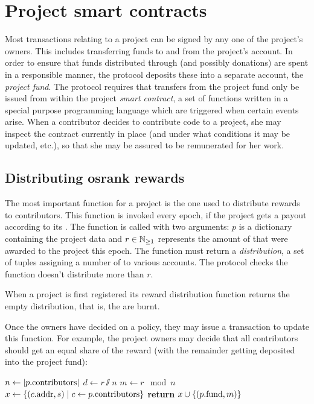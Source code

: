 
\section{Project smart contracts}
\label{s:smart-contracts}

Most transactions relating to a project can be signed by any one of the
project's owners. This includes transferring funds to and from the project's
account. In order to ensure that funds distributed through \osrank{} (and
possibly donations) are spent in a responsible manner, the protocol deposits
these into a separate account, the \emph{project fund}. The protocol requires
that transfers from the project fund only be issued from within the project
\emph{smart contract}, a set of functions written in a special purpose
programming language which are triggered when certain events arise. When a
contributor decides to contribute code to a project, she may inspect the
contract currently in place (and under what conditions it may be updated, etc.),
so that she may be assured to be remunerated for her work.

\subsection{Distributing osrank rewards}

The most important function for a project is the one used to distribute rewards
to contributors. This function is invoked every epoch, if the project gets a
payout according to its \osrank{}. The function is called with two arguments:
$p$ is a dictionary containing the project data and $r \in \mathbb{N}_{\geq 1}$ represents
the amount of \oscoin{} that were awarded to the project this epoch. The
function must return a \emph{distribution}, a set of tuples assigning a number
of \oscoin{} to various accounts. The protocol checks the function doesn't
distribute more than $r$.

When a project is first registered its reward distribution function returns the
empty distribution, that is, the \oscoin{} are burnt.

Once the owners have decided on a policy, they may issue a transaction to update
this function. For example, the project owners may decide that all contributors
should get an equal share of the reward (with the remainder getting deposited
into the project fund):
\begin{algorithmic}[1]
\State $n \gets |p.{\mathrm{contributors}}|$
\State $d \gets r \sslash n$
\State $m \gets r \mod n$
\State $x \gets \{ (c.{\mathrm{addr}}, s) \mid c \gets p.{\mathrm{contributors}} \}$
\State \textbf{return} $x \cup \{ (p.{\mathrm{fund}}, m) \}$
\EndProcedure
\end{algorithmic}


